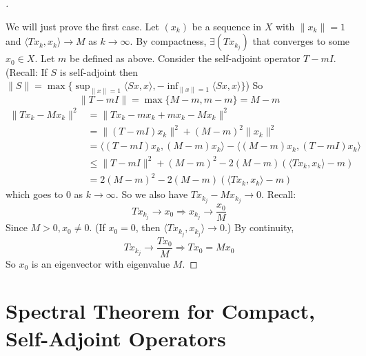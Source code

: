 \documentclass{article}
\theoremstyle{definition}
\newenvironment{proofs}[1][\proofname]{%
  \begin{proof}[#1]$ $\par\nobreak\ignorespaces
}{%
  \end{proof}
}
\begin{document}
\begin{proofs}
	We will just prove the first case.
	Let $(x_k)$ be a sequence in $X$ with $\|x_k\| = 1$ and $\langle T x_k, x_k \rangle \to M$ as $k \to \infty$.
	By compactness, $\exists (T x_{k_j})$ that converges to some $x_0 \in X$.
	Let $m$ be defined as above.
	Consider the self-adjoint operator $T - m I$.
	(Recall: If $S$ is self-adjoint then $\|S\| = \max\{ \sup_{\|x\| = 1} \langle Sx, x\rangle, -\inf_{\|x\| = 1} \langle S x, x \rangle\}$)
	So 
	\[
		\|T - mI\| = \max \{ M - m, m - m\} = M - m
	\]
	\[
		\begin{split}
			\|T x_k - M x_k\|^2 & = \|T x_k - m x_k + m x_k - M x_k\|^2\\
			& = \|(T - m I) x_k\|^2 + (M - m)^2 \|x_k\|^2 \\
			& = \langle (T - mI) x_k, (M - m) x_k \rangle - \langle (M - m) x_k, (T - mI) x_k \rangle\\
			& \leq \|T - mI\|^2 + (M - m)^2 - 2 (M - m)(\langle T x_k, x_k \rangle - m) \\
			& = 2(M - m)^2 - 2 (M - m)(\langle T x_k, x_k \rangle - m)
		\end{split}
	\]
	which goes to 0 as $k \to \infty$.
	So we also have $T x_{k_j} - M x_{k_j} \to 0$.
	Recall: 
	\[
		T x_{k_j} \to x_0 \Rightarrow x_{k_j} \to \frac{x_0}{M}
	\]
	Since $M > 0, x_0 \neq 0$.
	(If $x_0 = 0$, then $\langle T x_{k_j}, x_{k_j} \rangle \to 0$.)
	By continuity, 
	\[
		T x_{k_j} \to \frac{T x_0}{M} \Rightarrow T x_0 = M x_0
	\]
	So $x_0$ is an eigenvector with eigenvalue $M$.
\end{proofs}

\section{Spectral Theorem for Compact, Self-Adjoint Operators}
\end{document}
